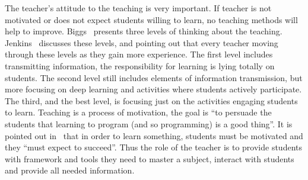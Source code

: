 \documentclass{article}
\begin{document}
The teacher's attitude to the teaching is very important. If teacher is not motivated or does not expect students willing to learn, no teaching methods will help to improve. Biggs~\cite{biggs2011teaching} presents three levels of thinking about
the teaching.  Jenkins~\cite{journey_Jenkins} discusses these levels,
and pointing out that every teacher moving through these levels as
they gain more experience. The first level includes transmitting
information, the responsibility for learning is lying totally on
students. The second level still includes elements of information
transmission, but more focusing on deep learning and activities where
students actively participate.  The third, and the best level, is
focusing just on the activities engaging students to learn. Teaching
is a process of motivation, the goal is ``to persuade the students
that learning to program (and so programming) is a good thing''. It is
pointed out in~\cite{journey_Jenkins} that in order to learn
something, students must be motivated and they ``must expect to
succeed''. Thus the role of the teacher is to provide students with framework and tools  they need to master a subject, interact with students and provide all needed information.





%
%
%
\end{document}
